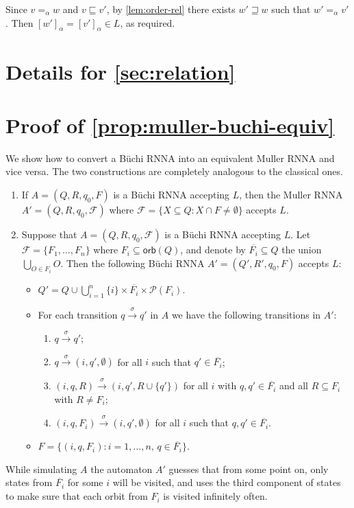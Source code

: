 \documentclass[10pt,a4paper]{amsart}
\newcommand{\compr}{:}
\newcommand{\F}{\mathcal{F}}
\numberwithin{equation}{section}
\newcommand{\ol}{\overline}
\newcommand{\xto}[1]{\xrightarrow{~#1~}}
\newcommand{\seq}{\subseteq}
\newcommand{\orb}{\mathsf{orb}}
\newcommand{\+}[1]{\mathcal{#1}\xspace}
\newcommand{\Pow}{\mathcal{P}}
\theoremstyle{definition}
\begin{document}
  Since $v=_\alpha w$ and $v\sqsubseteq v'$, by
  \autoref{lem:order-rel} there exists $w'\sqsupseteq w$ such that
  $w'=_\alpha v'$. Then $[w']_\alpha=[v']_\alpha\in L$, as required.



\section{Details for \autoref{sec:relation}}

\section*{Proof of \autoref{prop:muller-buchi-equiv}}
  We show how to convert a Büchi RNNA into an equivalent Muller RNNA
  and vice versa. The two constructions are completely analogous to the
  classical ones.
  \begin{enumerate}
  \item If $A=(Q,R,q_0,F)$ is a Büchi RNNA accepting $L$, then the
    Muller RNNA $A'=(Q,R,q_0,\F)$ where
    $\F = \{ X\seq Q \compr X\cap F\neq \emptyset \}$ accepts $L$.
    
  \item Suppose that $A=(Q,R,q_0,\F)$ is a Büchi RNNA accepting $L$. Let $\F=\{F_1,\ldots, F_n\}$ where $F_i\seq \orb(Q)$, and denote by $\ol{F_i}\seq Q$ the union $\bigcup_{O\in F_i} O$. Then the following Büchi RNNA $A'=(Q',R',q_0,F)$ accepts $L$:
    \begin{itemize}
    \item $Q' = Q \cup \bigcup_{i=1}^n \{i\}\times \ol{F_i} \times \Pow(F_i)$.
    \item For each transition $q\xto{\sigma} q'$ in $A$ we have the following transitions in $A'$:
      \begin{enumerate}[(1)]
        \setlength{\itemindent}{0.35cm}
      \item $q\xto{\sigma}q'$;
      \item $q\xto{\sigma} (i,q',\emptyset)$ for all $i$ such that $q'\in \ol{F_i}$;
      \item $(i,q,R)\xto{\sigma} (i,q',R\cup \{q'\})$ for all $i$ with
        $q,q'\in \ol{F_i}$ and all $R\seq F_i$ with $R\neq F_i$;
        
      \item $(i,q,F_i)\xto{\sigma} (i,q',\emptyset)$ for all $i$ such that $q,q'\in \ol{F_i}$.
      \end{enumerate}
    \item $F=\{ (i,q, F_i) \compr i=1,\ldots, n, \, q\in \ol{F_i} \}$. 
    \end{itemize} 
  \end{enumerate}
  While simulating $A$ the automaton $A'$ guesses that from some point
  on, only states from $\ol{F_i}$ for some $i$ will be visited, and
  uses the third component of states to make sure that each orbit from
  $F_i$ is visited infinitely often.
\end{document}
